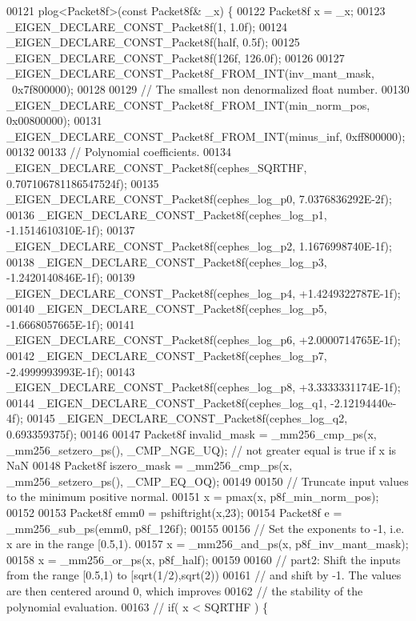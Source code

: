 \begin{DoxyCode}
00121 plog<Packet8f>(\textcolor{keyword}{const} Packet8f& \_x) \{
00122   Packet8f x = \_x;
00123   \_EIGEN\_DECLARE\_CONST\_Packet8f(1, 1.0f);
00124   \_EIGEN\_DECLARE\_CONST\_Packet8f(half, 0.5f);
00125   \_EIGEN\_DECLARE\_CONST\_Packet8f(126f, 126.0f);
00126 
00127   \_EIGEN\_DECLARE\_CONST\_Packet8f\_FROM\_INT(inv\_mant\_mask, ~0x7f800000);
00128 
00129   \textcolor{comment}{// The smallest non denormalized float number.}
00130   \_EIGEN\_DECLARE\_CONST\_Packet8f\_FROM\_INT(min\_norm\_pos, 0x00800000);
00131   \_EIGEN\_DECLARE\_CONST\_Packet8f\_FROM\_INT(minus\_inf, 0xff800000);
00132 
00133   \textcolor{comment}{// Polynomial coefficients.}
00134   \_EIGEN\_DECLARE\_CONST\_Packet8f(cephes\_SQRTHF, 0.707106781186547524f);
00135   \_EIGEN\_DECLARE\_CONST\_Packet8f(cephes\_log\_p0, 7.0376836292E-2f);
00136   \_EIGEN\_DECLARE\_CONST\_Packet8f(cephes\_log\_p1, -1.1514610310E-1f);
00137   \_EIGEN\_DECLARE\_CONST\_Packet8f(cephes\_log\_p2, 1.1676998740E-1f);
00138   \_EIGEN\_DECLARE\_CONST\_Packet8f(cephes\_log\_p3, -1.2420140846E-1f);
00139   \_EIGEN\_DECLARE\_CONST\_Packet8f(cephes\_log\_p4, +1.4249322787E-1f);
00140   \_EIGEN\_DECLARE\_CONST\_Packet8f(cephes\_log\_p5, -1.6668057665E-1f);
00141   \_EIGEN\_DECLARE\_CONST\_Packet8f(cephes\_log\_p6, +2.0000714765E-1f);
00142   \_EIGEN\_DECLARE\_CONST\_Packet8f(cephes\_log\_p7, -2.4999993993E-1f);
00143   \_EIGEN\_DECLARE\_CONST\_Packet8f(cephes\_log\_p8, +3.3333331174E-1f);
00144   \_EIGEN\_DECLARE\_CONST\_Packet8f(cephes\_log\_q1, -2.12194440e-4f);
00145   \_EIGEN\_DECLARE\_CONST\_Packet8f(cephes\_log\_q2, 0.693359375f);
00146 
00147   Packet8f invalid\_mask = \_mm256\_cmp\_ps(x, \_mm256\_setzero\_ps(), \_CMP\_NGE\_UQ); \textcolor{comment}{// not greater equal is true
       if x is NaN}
00148   Packet8f iszero\_mask = \_mm256\_cmp\_ps(x, \_mm256\_setzero\_ps(), \_CMP\_EQ\_OQ);
00149 
00150   \textcolor{comment}{// Truncate input values to the minimum positive normal.}
00151   x = pmax(x, p8f\_min\_norm\_pos);
00152 
00153   Packet8f emm0 = pshiftright(x,23);
00154   Packet8f e = \_mm256\_sub\_ps(emm0, p8f\_126f);
00155 
00156   \textcolor{comment}{// Set the exponents to -1, i.e. x are in the range [0.5,1).}
00157   x = \_mm256\_and\_ps(x, p8f\_inv\_mant\_mask);
00158   x = \_mm256\_or\_ps(x, p8f\_half);
00159 
00160   \textcolor{comment}{// part2: Shift the inputs from the range [0.5,1) to [sqrt(1/2),sqrt(2))}
00161   \textcolor{comment}{// and shift by -1. The values are then centered around 0, which improves}
00162   \textcolor{comment}{// the stability of the polynomial evaluation.}
00163   \textcolor{comment}{//   if( x < SQRTHF ) \{}

\end{DoxyCode}
